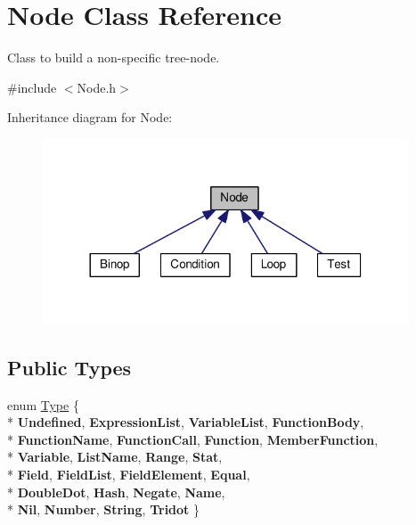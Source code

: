 \hypertarget{classNode}{}\section{Node Class Reference}
\label{classNode}


Class to build a non-\/specific tree-\/node.  




{\ttfamily \#include $<$Node.\+h$>$}



Inheritance diagram for Node\+:\nopagebreak
\begin{figure}[H]
\begin{center}
\leavevmode
\includegraphics[width=308pt]{classNode__inherit__graph}
\end{center}
\end{figure}
\subsection*{Public Types}
\begin{DoxyCompactItemize}
\item 
enum \hyperlink{classNode_a8dad370be1595f49e0a7c2406a91e867}{Type} \{ \\*
{\bfseries Undefined}, 
{\bfseries Expression\+List}, 
{\bfseries Variable\+List}, 
{\bfseries Function\+Body}, 
\\*
{\bfseries Function\+Name}, 
{\bfseries Function\+Call}, 
{\bfseries Function}, 
{\bfseries Member\+Function}, 
\\*
{\bfseries Variable}, 
{\bfseries List\+Name}, 
{\bfseries Range}, 
{\bfseries Stat}, 
\\*
{\bfseries Field}, 
{\bfseries Field\+List}, 
{\bfseries Field\+Element}, 
{\bfseries Equal}, 
\\*
{\bfseries Double\+Dot}, 
{\bfseries Hash}, 
{\bfseries Negate}, 
{\bfseries Name}, 
\\*
{\bfseries Nil}, 
{\bfseries Number}, 
{\bfseries String}, 
{\bfseries Tridot}
 \}
\end{DoxyCompactItemize}
